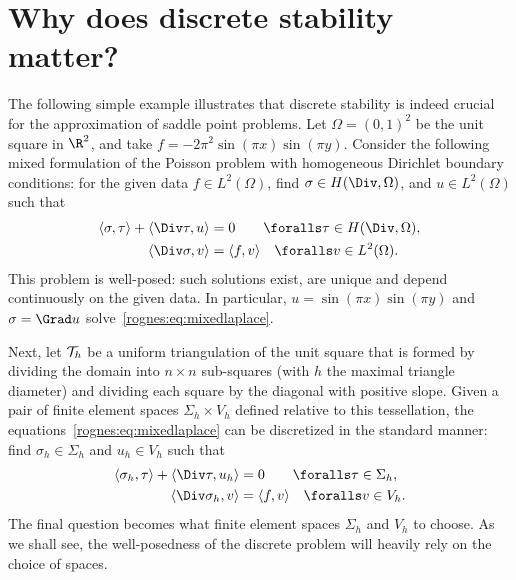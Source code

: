 \section{Why does discrete stability matter?}
\label{rognes:sec:motivation}

The following simple example illustrates that discrete stability is
indeed crucial for the approximation of saddle point problems. Let
$\Omega = (0, 1)^2$ be the unit square in $\R^2$, and take $f = - 2
\pi^2 \sin(\pi x) \sin(\pi y)$. Consider the following mixed
formulation of the Poisson problem with homogeneous Dirichlet boundary
conditions: for the given data $f \in L^2(\Omega)$, find $\sigma \in
H(\Div, \Omega)$, and $u \in L^2(\Omega)$ such that
\begin{equation}
  \label{rognes:eq:mixedlaplace}
  \begin{split}
    \langle \sigma, \tau \rangle + \langle \Div \tau, u \rangle &= 0
    \quad\quad \foralls \tau \in H(\Div, \Omega), \\
    \langle \Div \sigma, v \rangle &= \langle f, v \rangle
    \quad \foralls v \in L^2(\Omega).
  \end{split}
\end{equation}
This problem is well-posed: such solutions exist, are unique and
depend continuously on the given data. In particular, $u = \sin(\pi x)
\sin(\pi y)$ and $\sigma = \Grad u$
solve~\eqref{rognes:eq:mixedlaplace}.

Next, let $\mathcal{T}_h$ be a uniform triangulation of the unit
square that is formed by dividing the domain into $n \times n$
sub-squares (with $h$ the maximal triangle diameter) and dividing each
square by the diagonal with positive slope. Given a pair of finite
element spaces $\Sigma_h \times V_h$ defined relative to this
tessellation, the equations~\eqref{rognes:eq:mixedlaplace} can be
discretized in the standard manner: find $\sigma_h \in \Sigma_h$ and
$u_h \in V_h$ such that
\begin{equation}
  \label{rognes:eq:mixedlaplace:discrete}
  \begin{split}
    \langle \sigma_h, \tau \rangle + \langle \Div \tau, u_h \rangle &= 0
    \quad\quad \foralls \tau \in \Sigma_h, \\
    \langle \Div \sigma_h, v \rangle &= \langle f, v \rangle
    \quad \foralls v \in V_h.
  \end{split}
\end{equation}
The final question becomes what finite element spaces $\Sigma_h$ and
$V_h$ to choose. As we shall see, the well-posedness of the discrete
problem will heavily rely on the choice of spaces.

